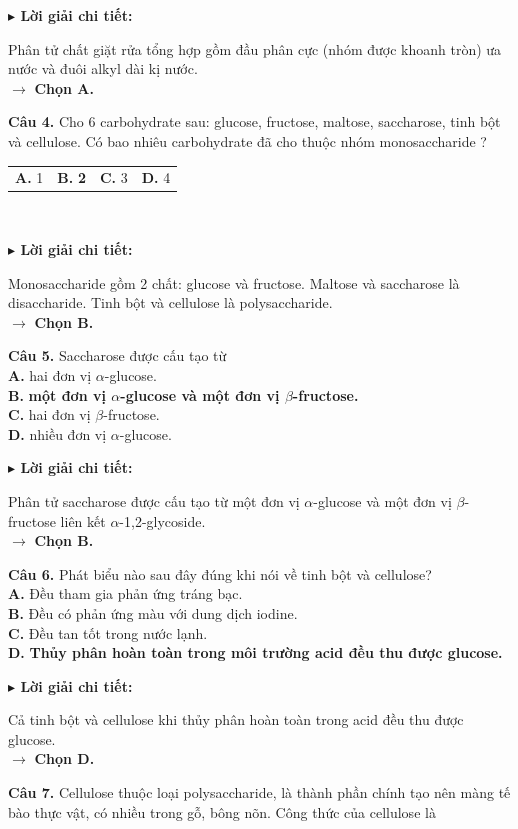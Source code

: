 \documentclass[11pt,a4paper]{article}
\newcommand{\loigiai}[1]{
    \par\vspace{2pt}
    \begingroup\leftskip=12pt
    \textcolor{solBlue}{\textbf{$\blacktriangleright$ Lời giải chi tiết:}}\par
    \small #1
    \par\endgroup\vspace{3pt}
}
\begin{document}
\loigiai{Phân tử chất giặt rửa tổng hợp gồm đầu phân cực (nhóm \ce{-OSO3^- Na+} được khoanh tròn) ưa nước và đuôi alkyl dài kị nước.\\$\to$ \textbf{Chọn A.}}
\vspace{2pt}
\textbf{Câu 4.} Cho 6 carbohydrate sau: glucose, fructose, maltose, saccharose, tinh bột và cellulose. Có bao nhiêu carbohydrate đã cho thuộc nhóm monosaccharide ?\\[2pt]
\begin{tabularx}{\textwidth}{@{}XXXX@{}}\textbf{A.} 1 & \textbf{\color{ansRed}B.} \textbf{\color{ansRed}2} & \textbf{C.} 3 & \textbf{D.} 4\end{tabularx}\\[2pt]
\loigiai{Monosaccharide gồm 2 chất: glucose và fructose. Maltose và saccharose là disaccharide. Tinh bột và cellulose là polysaccharide.\\$\to$ \textbf{Chọn B.}}
\vspace{2pt}
\textbf{Câu 5.} Saccharose được cấu tạo từ\\[2pt]
\quad \textbf{A.} hai đơn vị $\alpha$-glucose.\\[2pt]
\quad \textbf{\color{ansRed}B.} \textbf{\color{ansRed}một đơn vị $\alpha$-glucose và một đơn vị $\beta$-fructose.}\\[2pt]
\quad \textbf{C.} hai đơn vị $\beta$-fructose.\\[2pt]
\quad \textbf{D.} nhiều đơn vị $\alpha$-glucose.\\[2pt]
\loigiai{Phân tử saccharose được cấu tạo từ một đơn vị $\alpha$-glucose và một đơn vị $\beta$-fructose liên kết $\alpha$-1,2-glycoside.\\$\to$ \textbf{Chọn B.}}
\vspace{2pt}
\textbf{Câu 6.} Phát biểu nào sau đây đúng khi nói về tinh bột và cellulose?\\[2pt]
\quad \textbf{A.} Đều tham gia phản ứng tráng bạc.\\[2pt]
\quad \textbf{B.} Đều có phản ứng màu với dung dịch iodine.\\[2pt]
\quad \textbf{C.} Đều tan tốt trong nước lạnh.\\[2pt]
\quad \textbf{\color{ansRed}D.} \textbf{\color{ansRed}Thủy phân hoàn toàn trong môi trường acid đều thu được glucose.}\\[2pt]
\loigiai{Cả tinh bột và cellulose khi thủy phân hoàn toàn trong acid đều thu được glucose.\\$\to$ \textbf{Chọn D.}}
\vspace{2pt}
\textbf{Câu 7.} Cellulose thuộc loại polysaccharide, là thành phần chính tạo nên màng tế bào thực vật, có nhiều trong gỗ, bông nõn. Công thức của cellulose là\\[2pt]
\end{document}
